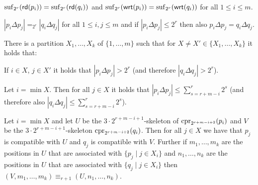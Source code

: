 \begin{bracketenumerate}
	\item\label{item:E_suffix} $\operatorname{suf}_{2^{r}}(\mathsf{rd}(p_i)) = \operatorname{suf}_{2^{r}}(\mathsf{rd}(q_i))$ and $\operatorname{suf}_{2^{r}}(\mathsf{wrt}(p_i)) = \operatorname{suf}_{2^{r}}(\mathsf{wrt}(q_i))$ for all $1\leq i\leq m$.
	\item\label{item:E_distance} $|p_i \Delta p_j| =_{2^r} |q_i\Delta q_j|$ for all $1\leq i, j\leq m$ and if $|p_i\Delta p_j| \leq 2^r$ then also $p_i \Delta p_j = q_i\Delta q_j$. 
	\item\label{item:E_partition} There is a partition $X_1,\ldots,X_k$ of $\{1,\ldots,m\}$ such that for $X\neq X'\in \{X_1,\ldots,X_k\}$ it holds that: 
	\begin{alphaenumerate}
		\item If $i\in X$, $j\in X'$ it holds that $|p_i\Delta p_j| > 2^r$ (and therefore $|q_i\Delta q_j| > 2^r$).
		\item Let $i= \min X$. Then for all $j\in X$ it holds that $|p_i \Delta p_j| \leq \sum_{s= r+m-i}^{r} 2^s$ (and therefore also $|q_i \Delta q_j| \leq \sum_{s= r+m-i}^{r} 2^s$).
		\item\label{subitem:E_partition:equivalence} Let $i= \min X$ and let $U$ be the $3\cdot 2^{r+m-i+1}$-skeleton of $\operatorname{cpr}_{2^{r+m-i+2}}(p_i)$ and $V$ be the $3\cdot 2^{r+m-i+1}$-skeleton $\operatorname{cpr}_{2^{r+m-i+2}}(q_i)$. Then for all 
		$j\in X$ we have that $p_j$ is compatible with $U$ and $q_j$ is compatible with $V$. Further if $m_1,\ldots, m_k$ are the positions in $U$ that are associated with $\{p_j \mid j\in X_i \}$ and $n_1,\ldots, n_k$ are the positions in $U$ that are associated with $\{q_j \mid j\in X_i \}$ then $(V,m_1,\ldots,m_k) \equiv_{r+1} (U,n_1,\ldots,n_k)$.
	\end{alphaenumerate}  
\end{bracketenumerate} 

